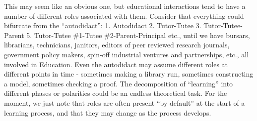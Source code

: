 This may seem like an obvious one, but educational interactions tend to
have a number of different roles associated with them. Consider that
everything could bifurcate from the ``autodidact'':
1. Autodidact 2. Tutor-Tutee 3. Tutor-Tutee-Parent 5. Tutor-Tutee
\#1-Tutee \#2-Parent-Principal etc., until we have bursars, librarians,
technicians, janitors, editors of peer reviewed research journals,
government policy makers, spin-off industrial ventures and partnerships,
etc., all involved in Education. Even the autodidact may assume
different roles at different points in time - sometimes making a library
run, sometimes constructing a model, sometimes checking a proof. The
decomposition of ``learning'' into different phases or polarities could
be an endless theoretical task. For the moment, we just note that roles
are often present ``by default'' at the start of a learning process, and
that they may change as the process develops.
